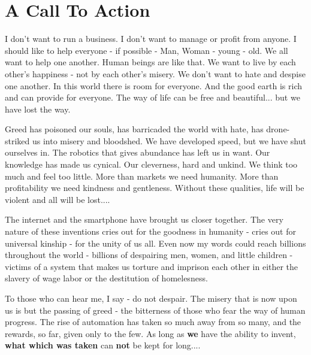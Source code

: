 \documentclass{article}
\begin{document}
\pagebreak


\section{A Call To Action}

{\fontsize{11pt}{11pt}\selectfont
I don't want to run a business. I don't want to manage or profit from
anyone. I should like to help everyone - if possible - Man, Woman -
young - old. We all want to help one another. Human beings are like
that. We want to live by each other's happiness - not by each other's
misery. We don't want to hate and despise one another. In this world
there is room for everyone. And the good earth is rich and can provide
for everyone. The way of life can be free and beautiful... but we have
lost the way.

Greed has poisoned our souls, has barricaded the world with hate, has
drone-striked us into misery and bloodshed. We have developed speed, but
we have shut ourselves in. The robotics that gives abundance has left us in
want. Our knowledge has made us cynical. Our cleverness, hard and
unkind. We think too much and feel too little. More than markets we need
humanity. More than profitability we need kindness and gentleness.
Without these qualities, life will be violent and all will be lost....

The internet and the smartphone have brought us closer together. The
very nature of these inventions cries out for the goodness in humanity -
cries out for universal kinship - for the unity of us all. Even now my
words could reach billions throughout the world - billions of
despairing men, women, and little children - victims of a system that
makes us torture and imprison each other in either the slavery of wage labor or the destitution of homelesness.

To those who can hear me, I say - do not despair. The misery that is now
upon us is but the passing of greed - the bitterness of those who fear
the way of human progress. The rise of automation has taken so much away
from so many, and the rewards, so far, given only to the few. As long as
\textbf{we} have the ability to invent, \textbf{what which was taken} can
\textbf{not} be kept for long....

}
\end{document}
